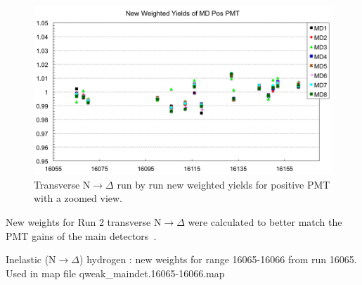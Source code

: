 \begin{figure}[!h]
	\begin{center}
	\includegraphics[width=15.0cm]{figures/transverseN2DeltaRunByRunWeightedYieldsPosPMT}
	\end{center}
	\caption
	{Transverse N$\rightarrow\Delta$ run by run new weighted yields for positive PMT with a zoomed view.}
	\label{fig:transverseN2DeltaRunByRunWeightedYieldsPosPMT}
\end{figure}



New weights for Run 2 transverse N$\rightarrow\Delta$ were calculated to better match the PMT gains of the main detectors~\cite{elog:buddhini_analysis800}.

Inelastic (N$\rightarrow\Delta$) hydrogen : new weights for range 16065-16066 from run 16065. Used in map file qweak\_maindet.16065-16066.map




